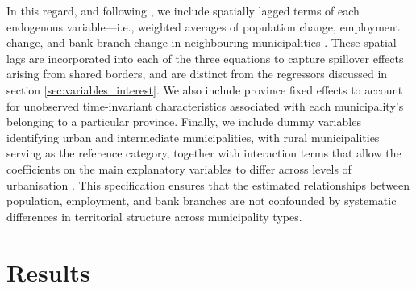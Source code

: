 \documentclass[a4paper,11pt,oneside]{article}
\newcommand{\Emili}{\color{emili}}
\begin{document}
In this regard, and following \citet{alama2025spatio}, we include spatially lagged terms of each endogenous variable---i.e., weighted averages of population change, employment change, and bank branch change in neighbouring municipalities \citep{de2012regional,de2012sectoral}. These spatial lags are incorporated into each of the three equations to capture spillover effects arising from shared borders, and are distinct from the regressors discussed in section \ref{sec:variables_interest}. We also include province fixed effects to account for unobserved time-invariant characteristics associated with each municipality's belonging to a particular province. Finally, we include dummy variables identifying urban and intermediate municipalities, with rural municipalities serving as the reference category, together with interaction terms that allow the coefficients on the main explanatory variables to differ across levels of urbanisation \citep[e.g.,][]{hegerty2021bank}. This specification ensures that the estimated relationships between population, employment, and bank branches are not confounded by systematic differences in territorial structure across municipality types.




\section{Results}
\label{sec:results}


\end{document}
